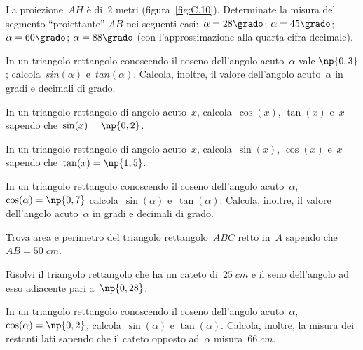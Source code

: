 \begin{multicols}{2}
\begin{esercizio}
\label{ese:C.14}
La proiezione~$AH$ è di~$2$ metri (figura~\ref{fig:C.10}). Determinate la misura del segmento ``proiettante'' $AB$ nei seguenti casi:~$\alpha=28\grado$;
$\alpha=45\grado$; $\alpha=60\grado$; $\alpha=88\grado$ (con l'approssimazione alla quarta cifra decimale).
\end{esercizio}

\begin{esercizio}
\label{ese:C.15}
In un triangolo rettangolo conoscendo il coseno dell'angolo acuto~$\alpha$ vale $\np{0,3}$; calcola~$sin(\alpha)$ e~$tan(\alpha)$.
Calcola, inoltre, il valore dell'angolo acuto~$\alpha$ in gradi e decimali di grado.
\end{esercizio}

\begin{esercizio}
\label{ese:C.16}
In un triangolo rettangolo di angolo acuto~$x$, calcola~$\cos(x)$, $\tan(x)$ e~$x$ sapendo che~$\sin(x)=\np{0,2}$.
\end{esercizio}

\begin{esercizio}
\label{ese:C.17}
In un triangolo rettangolo di angolo acuto~$x$, calcola~$\sin(x)$, $\cos(x)$ e~$x$ sapendo che~$\tan(x)=\np{1,5}$.
\end{esercizio}

\begin{esercizio}
\label{ese:C.18}
In un triangolo rettangolo conoscendo il coseno dell'angolo acuto~$\alpha$, $\cos(\alpha)=\np{0,7}$ calcola~$\sin(\alpha)$ e~$\tan(\alpha)$.
Calcola, inoltre, il valore dell'angolo acuto~$\alpha$ in gradi e decimali di grado.
\end{esercizio}

\begin{esercizio}
\label{ese:C.19}
Trova area e perimetro del triangolo rettangolo~$ABC$ retto in~$A$ sapendo che~$AB=50\;\unit{cm}$.
\end{esercizio}

\begin{esercizio}
\label{ese:C.20}
Risolvi il triangolo rettangolo che ha un cateto di~$25\;\unit{cm}$ e il seno dell'angolo ad esso adiacente pari a~$\np{0,28}$.
\end{esercizio}

\begin{esercizio}
\label{ese:C.21}
In un triangolo rettangolo conoscendo il coseno dell'angolo acuto~$\alpha$, $\cos(\alpha)=\np{0,2}$, calcola~$\sin(\alpha)$ e
$\tan(\alpha)$. Calcola, inoltre, la misura dei restanti lati sapendo che il cateto opposto ad~$\alpha$ misura~$66\;\unit{cm}$.
\end{esercizio}
\end{multicols}

